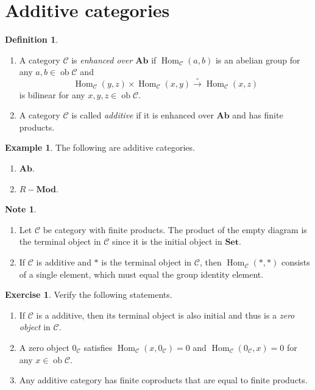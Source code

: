 \documentclass[10pt,letterpaper,cm]{nupset}
\theoremstyle{definition}
\newtheorem*{definition}{Definition}
\newtheorem{exmp}{Example}
\newtheorem{note}{Note}
\newtheorem{exercise}{Exercise}
\newcommand{\1}{\mathbf{1}}
\renewcommand{\c}{\mathscr{C}}
\newcommand{\0}{\vec 0}
\DeclareMathOperator{\ob}{ob}
\DeclareMathOperator{\Hom}{Hom}
\begin{document}
\section{Additive categories}

\begin{definition}
\begin{enumerate}
\item A category $\c$ is \textit{enhanced over $\mathbf{Ab}$} if $\Hom_{\c}(a, b)$ is an abelian group for any $a, b \in \ob{\c}$ and $$\Hom_{\c}(y, z) \times \Hom_{\c}(x,y) \overset{\circ}{\longrightarrow} \Hom_{\c}(x,z)$$ is bilinear for any $x,y,z\in \ob{\c}$.
\item A category $\c$ is called \textit{additive} if it is enhanced over $\mathbf{Ab}$ and has finite products. 
\end{enumerate}
\end{definition}

\begin{exmp} The following are additive categories. 
\begin{enumerate}
\item $\mathbf{Ab}$.
\item $R{-}\mathbf{Mod}$.
\end{enumerate}
\end{exmp}

\begin{note} $ $
\begin{enumerate}
\item Let $\c$ be category with finite products. The product of the empty diagram is the terminal object in $\c$ since it is the initial object in $\mathbf{Set}$.
\item If $\c$ is additive and $\ast$ is the terminal object in $\c$, then $\Hom_{\c}(\ast,\ast)$ consists of a single element, which must equal the group identity element.
\end{enumerate}
\end{note}

\begin{exercise} Verify the following statements.
\begin{enumerate}
\item If $\c$ is a additive, then its terminal object is also initial and thus is a \textit{zero object} in $\c$. 
\item A zero object $0_{\c}$ satisfies $\Hom_{\c}(x, 0_{\c}) =0$ and $\Hom_{\c}(0_{\c}, x) =0$ for any $x\in \ob{\c}$.
\item Any additive category has finite coproducts that are equal to finite products.
\end{enumerate}
\end{exercise}
\end{document}
